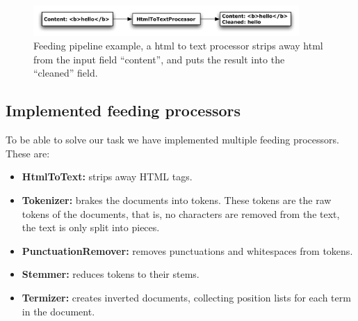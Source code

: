 \begin{figure}[htb]
	\centering
	\includegraphics[width=0.9\textwidth]{processor.pdf}
	\caption[Feeding pipeline example]{Feeding pipeline example, a html to text processor strips away html from the input field ``content'', and puts the result into the ``cleaned'' field.}\label{fig:feeding_processor}
\end{figure}

\subsection{Implemented feeding processors}\label{sub:implemented_feeding_processors}
To be able to solve our task we have implemented multiple feeding processors. These are:

\begin{itemize}
	\item \textbf{HtmlToText:} strips away HTML tags.
	\item \textbf{Tokenizer:} brakes the documents into tokens. These tokens are the raw tokens of the documents, that is, no characters are removed from the text, the text is only split into pieces.
	\item \textbf{PunctuationRemover:} removes punctuations and whitespaces from tokens. 
	\item \textbf{Stemmer:} reduces tokens to their stems. 
	\item \textbf{Termizer:} creates inverted documents, collecting position lists for each term in the document.
\end{itemize}